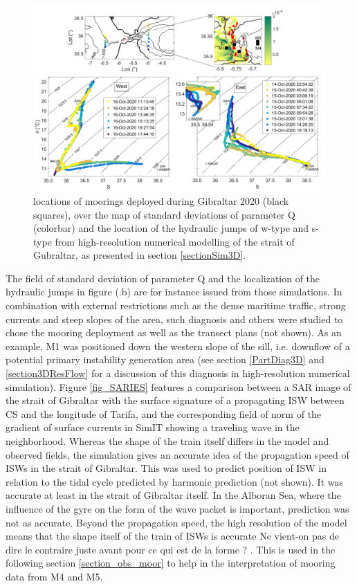 \begin{figure}[!h]
 \includegraphics[width=\textwidth]{./GBR3D/Fig_Moor.png}
 \caption {locations of moorings deployed during Gibraltar 2020 (black squares), over the map of standard deviations of parameter Q (colorbar) and the location of the hydraulic jumps of w-type and s-type from high-resolution numerical modelling of the strait of Gubraltar, as presented in section \ref{sectionSim3D}.}
 \label{fig_moor}
\end{figure}
The field of standard deviation of parameter Q and the localization of the hydraulic jumps in figure (.b) are for instance issued from those simulations. In combination with external restrictions such as the dense maritime traffic, strong currents and steep slopes of the area, such diagnosis and others were studied to chose the mooring deployment as well as the transect plans (not shown). As an example, M1 was positioned down the western slope of the sill, i.e. downflow of a potential primary instability generation area (see section \ref{PartDiag3D} and \ref{section3DResFlow} for a discussion of this diagnosis in high-resolution numerical simulation).
Figure \ref{fig_SARIES} features a comparison between a SAR image of the strait of Gibraltar with the surface signature of a propagating ISW between CS and the longitude of Tarifa, and the corresponding field of norm of the gradient of surface currents in SimIT showing a traveling wave in the neighborhood. Whereas the shape of the train itself differs in the model and observed fields, the simulation gives an accurate idea of the propagation speed of ISWs in the strait of Gibraltar. This was used to predict position of ISW in relation to the tidal cycle predicted by harmonic prediction (not shown). It was accurate at least in the strait of Gibraltar itself. In the Alboran Sea, where the influence of the gyre on the form of the wave packet is important, prediction was not as accurate. 
Beyond the propagation speed, the high resolution of the model means that the shape itself of the train of ISWs is accurate \color{blue}Ne vient-on pas de dire le contraire juste avant pour ce qui est de la forme ? \color{black}. This is used in the following section \ref{section_obs_moor} to help in the interpretation of mooring data from M4 and M5.

